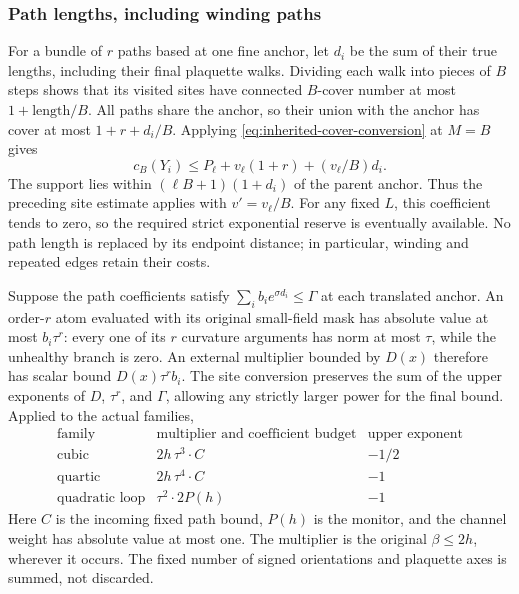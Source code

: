 \subsubsection{Path lengths, including winding paths}
For a bundle of $r$ paths based at one fine anchor, let $d_i$ be
the sum of their true lengths, including their final plaquette
walks. Dividing each walk into pieces of $B$ steps shows that its
visited sites have connected $B$-cover number at most
$1+\text{length}/B$. All paths share the anchor, so their union
with the anchor has cover at most $1+r+d_i/B$. Applying
\eqref{eq:inherited-cover-conversion} at $M=B$ gives
\[
 c_B(Y_i)\le P_\ell+v_\ell(1+r)+(v_\ell/B)d_i.
\]
The support lies within $(\ell B+1)(1+d_i)$ of the parent
anchor. Thus the preceding site estimate applies with
$v'=v_\ell/B$. For any fixed $L$, this coefficient tends to
zero, so the required strict exponential reserve is eventually
available. No path length is replaced by its endpoint distance;
in particular, winding and repeated edges retain their costs.

Suppose the path coefficients satisfy
$\sum_i b_i e^{\sigma d_i}\le\Gamma$ at each translated
anchor. An order-$r$ atom evaluated with its original small-field
mask has absolute value at most $b_i\tau^r$: every one of its
$r$ curvature arguments has norm at most $\tau$, while the
unhealthy branch is zero. An external multiplier bounded by
$D(x)$ therefore has scalar bound $D(x)\tau^r b_i$.
The site conversion preserves the sum of the upper exponents
of $D$, $\tau^r$, and $\Gamma$, allowing any strictly larger
power for the final bound. Applied to the actual families,
\[
 \begin{array}{c|c|c}
 \text{family}&\text{multiplier and coefficient budget}&
                 \text{upper exponent}\\ \hline
 \text{cubic}&2h\,\tau^3\cdot C&-1/2\\
 \text{quartic}&2h\,\tau^4\cdot C&-1\\
 \text{quadratic loop}&\tau^2\cdot2P(h)&-1
 \end{array}
\]
Here $C$ is the incoming fixed path bound, $P(h)$ is the monitor,
and the channel weight has absolute value at most one. The
multiplier is the original $\beta\le2h$, wherever it occurs.
The fixed number of signed orientations and plaquette axes is
summed, not discarded.

